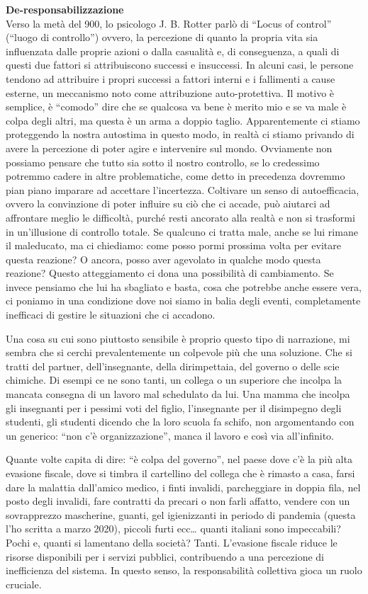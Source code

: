 \documentclass[12pt]{book} %
\begin{document}
\noindent \textbf{\large De-responsabilizzazione} \\
Verso la metà del 900, lo psicologo J. B. Rotter parlò di “Locus of control” (“luogo di controllo”) ovvero, la
percezione di quanto la propria vita sia influenzata dalle proprie azioni o dalla casualità e, di conseguenza, a quali
di questi due fattori si attribuiscono successi e insuccessi. In alcuni casi, le persone tendono ad attribuire i propri successi a fattori interni e i fallimenti a cause esterne, un meccanismo noto come attribuzione auto-protettiva. 
Il motivo è semplice, è “comodo” dire che se qualcosa va bene è merito mio e se va male è colpa
degli altri, ma questa è un arma a doppio taglio. Apparentemente ci stiamo proteggendo la nostra autostima in questo
modo, in realtà ci stiamo privando di avere la percezione di poter agire e intervenire sul mondo. Ovviamente non
possiamo pensare che tutto sia sotto il nostro controllo, se lo credessimo potremmo cadere in altre problematiche, come
detto in precedenza dovremmo pian piano imparare ad accettare l'incertezza. Coltivare un senso di autoefficacia, ovvero la convinzione di poter influire su ciò che ci accade, può aiutarci ad affrontare meglio le difficoltà, purché resti ancorato alla realtà e non si trasformi in un’illusione di controllo totale. Se qualcuno ci tratta male, anche se lui rimane il maleducato, ma
ci chiediamo: come posso pormi prossima volta per evitare questa reazione? O ancora, posso aver agevolato in qualche
modo questa reazione? Questo atteggiamento ci dona una possibilità di cambiamento. Se invece pensiamo che lui ha
sbagliato e basta, cosa che potrebbe anche essere vera, ci poniamo in una condizione dove noi siamo in balia degli
eventi, completamente inefficaci di gestire le situazioni che ci accadono.

Una cosa su cui sono piuttosto sensibile è proprio questo tipo di narrazione, mi sembra che si cerchi prevalentemente un
colpevole più che una soluzione. Che si tratti del partner, dell'insegnante, della dirimpettaia,
del governo o delle scie chimiche. Di esempi ce ne sono tanti, un collega o un superiore che incolpa la mancata
consegna di un lavoro mal schedulato da lui. Una mamma che incolpa gli insegnanti per i pessimi voti del figlio,
l'insegnante per il disimpegno degli studenti, gli studenti dicendo che la loro scuola fa schifo,
non argomentando con un generico: “non c'è organizzazione”, manca il lavoro e così via
all'infinito.

Quante volte capita di dire: “è colpa del governo”, nel paese dove c'è la più alta evasione
fiscale, dove si timbra il cartellino del collega che è rimasto a casa, farsi dare la malattia
dall'amico medico, i finti invalidi, parcheggiare in doppia fila, nel posto degli invalidi, fare
contratti da precari o non farli affatto, vendere con un sovrapprezzo mascherine, guanti, gel igienizzanti in periodo
di pandemia (questa l'ho scritta a marzo 2020), piccoli furti ecc… quanti italiani sono
impeccabili? Pochi e, quanti si lamentano della società? Tanti. L’evasione fiscale riduce le risorse disponibili per i servizi pubblici, contribuendo a una percezione di inefficienza del sistema. In questo senso, la responsabilità collettiva gioca un ruolo cruciale.
\end{document}

